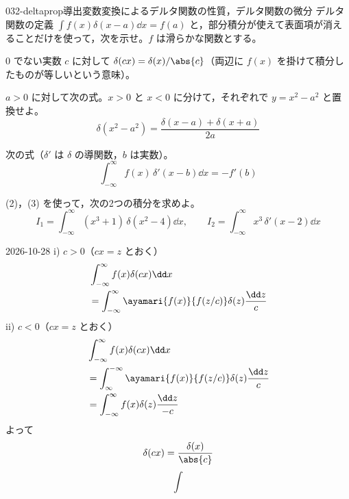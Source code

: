 \documentclass[uplatex,dvipdfmx,a4paper,11pt]{jsarticle}
\begin{document}
\begin{mondai}{032-deltaprop}{導出}{変数変換によるデルタ関数の性質，デルタ関数の微分}
デルタ関数の定義 $\int f(x)\delta(x-a)\dd x=f(a)$ と，部分積分が使えて表面項が消えることだけを使って，次を示せ。$f$ は滑らかな関数とする。
  \begin{shoumon}
    \item 0 でない実数 $c$ に対して $\delta(cx)=\delta(x)/\abs{c}$（両辺に $f(x)$ を掛けて積分したものが等しいという意味）。
    \item $a>0$ に対して次の式。$x>0$ と $x<0$ に分けて，それぞれで $y=x^{2}-a^{2}$ と置換せよ。
    \[ \delta(x^{2}-a^{2})=\frac{\delta(x-a)+\delta(x+a)}{2a} \]
    \item 次の式（$\delta'$ は $\delta$ の導関数，$b$ は実数）。
    \[ \int_{-\infty}^{\infty}f(x)\,\delta'(x-b)\dd x=-f'(b) \]
    \item (2)，(3) を使って，次の2つの積分を求めよ。
    \[ I_{1}=\int_{-\infty}^{\infty}(x^{3}+1)\,\delta(x^{2}-4)\dd x,\qquad I_{2}=\int_{-\infty}^{\infty}x^{3}\,\delta'(x-2)\dd x \]
  \end{shoumon}
\begin{kotaeutsushi}{2026-10-28}
i) $c>0$（$cx=z$ とおく）
\begin{align*}
&\int_{-\infty}^{\infty}f(x)\delta(cx)\dd x\\
&=\int_{-\infty}^{\infty}\ayamari{f(x)}{f(z/c)}\delta(z)\frac{\dd z}{c}
\end{align*}
ii) $c<0$（$cx=z$ とおく）
\begin{align*}
&\int_{-\infty}^{\infty}f(x)\delta(cx)\dd x\\
&=\int_{\infty}^{-\infty}\ayamari{f(x)}{f(z/c)}\delta(z)\frac{\dd z}{c}\\
&=\int_{-\infty}^{\infty}f(x)\delta(z)\frac{\dd z}{-c}
\end{align*}
よって
\[ \delta(cx)=\frac{\delta(x)}{\abs{c}} \]
\[ \int \]

\end{kotaeutsushi}
\end{mondai}
\end{document}

